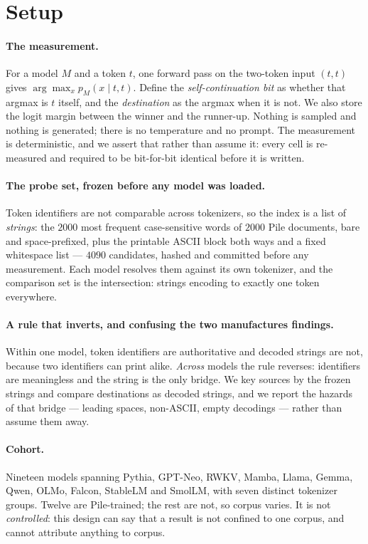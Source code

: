 \documentclass[11pt]{article}
\newcommand{\diag}{(t,t)}
\begin{document}
\section{Setup}\label{sec:setup}

\paragraph{The measurement.} For a model $M$ and a token $t$, one forward pass on the two-token input
$\diag$ gives $\arg\max_x p_M(x \mid t, t)$. Define the \emph{self-continuation bit} as whether that
argmax is $t$ itself, and the \emph{destination} as the argmax when it is not. We also store the
logit margin between the winner and the runner-up. Nothing is sampled and nothing is generated;
there is no temperature and no prompt. The measurement is deterministic, and we assert that rather
than assume it: every cell is re-measured and required to be bit-for-bit identical before it is
written.

\paragraph{The probe set, frozen before any model was loaded.} Token identifiers are not comparable
across tokenizers, so the index is a list of \emph{strings}: the $2000$ most frequent case-sensitive
words of $2000$ Pile documents, bare and space-prefixed, plus the printable ASCII block both ways and
a fixed whitespace list --- $4090$ candidates, hashed and committed before any measurement. Each
model resolves them against its own tokenizer, and the comparison set is the intersection: strings
encoding to exactly one token everywhere.

\paragraph{A rule that inverts, and confusing the two manufactures findings.} Within one model, token
identifiers are authoritative and decoded strings are not, because two identifiers can print alike.
\emph{Across} models the rule reverses: identifiers are meaningless and the string is the only
bridge. We key sources by the frozen strings and compare destinations as decoded strings, and we
report the hazards of that bridge --- leading spaces, non-ASCII, empty decodings --- rather than
assume them away.

\paragraph{Cohort.} Nineteen models spanning Pythia, GPT-Neo, RWKV, Mamba, Llama, Gemma, Qwen, OLMo,
Falcon, StableLM and SmolLM, with seven distinct tokenizer groups. Twelve are Pile-trained; the rest
are not, so corpus varies. It is not \emph{controlled}: this design can say that a result is not
confined to one corpus, and cannot attribute anything to corpus.
\end{document}
